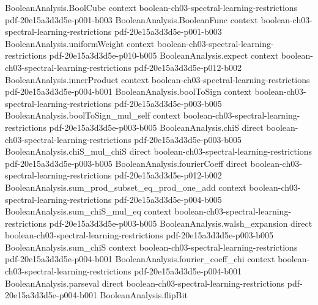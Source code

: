 \begin{lemma}
\label{KKL.lowDegree_approx}
\leanok
{}
\proofstep
  {BooleanAnalysis.BoolCube}
  {context}
  {boolean-ch03-spectral-learning-restrictions}
  {pdf-20e15a3d3d5e-p001-b003}
\proofstep
  {BooleanAnalysis.BooleanFunc}
  {context}
  {boolean-ch03-spectral-learning-restrictions}
  {pdf-20e15a3d3d5e-p001-b003}
\proofstep
  {BooleanAnalysis.uniformWeight}
  {context}
  {boolean-ch03-spectral-learning-restrictions}
  {pdf-20e15a3d3d5e-p010-b005}
\proofstep
  {BooleanAnalysis.expect}
  {context}
  {boolean-ch03-spectral-learning-restrictions}
  {pdf-20e15a3d3d5e-p012-b002}
\proofstep
  {BooleanAnalysis.innerProduct}
  {context}
  {boolean-ch03-spectral-learning-restrictions}
  {pdf-20e15a3d3d5e-p004-b001}
\proofstep
  {BooleanAnalysis.boolToSign}
  {context}
  {boolean-ch03-spectral-learning-restrictions}
  {pdf-20e15a3d3d5e-p003-b005}
\proofstep
  {BooleanAnalysis.boolToSign_mul_self}
  {context}
  {boolean-ch03-spectral-learning-restrictions}
  {pdf-20e15a3d3d5e-p003-b005}
\proofstep
  {BooleanAnalysis.chiS}
  {direct}
  {boolean-ch03-spectral-learning-restrictions}
  {pdf-20e15a3d3d5e-p003-b005}
\proofstep
  {BooleanAnalysis.chiS_mul_chiS}
  {direct}
  {boolean-ch03-spectral-learning-restrictions}
  {pdf-20e15a3d3d5e-p003-b005}
\proofstep
  {BooleanAnalysis.fourierCoeff}
  {direct}
  {boolean-ch03-spectral-learning-restrictions}
  {pdf-20e15a3d3d5e-p012-b002}
\proofstep
  {BooleanAnalysis.sum_prod_subset_eq_prod_one_add}
  {context}
  {boolean-ch03-spectral-learning-restrictions}
  {pdf-20e15a3d3d5e-p004-b005}
\proofstep
  {BooleanAnalysis.sum_chiS_mul_eq}
  {context}
  {boolean-ch03-spectral-learning-restrictions}
  {pdf-20e15a3d3d5e-p003-b005}
\proofstep
  {BooleanAnalysis.walsh_expansion}
  {direct}
  {boolean-ch03-spectral-learning-restrictions}
  {pdf-20e15a3d3d5e-p003-b005}
\proofstep
  {BooleanAnalysis.sum_chiS}
  {context}
  {boolean-ch03-spectral-learning-restrictions}
  {pdf-20e15a3d3d5e-p004-b001}
\proofstep
  {BooleanAnalysis.fourier_coeff_chi}
  {context}
  {boolean-ch03-spectral-learning-restrictions}
  {pdf-20e15a3d3d5e-p004-b001}
\proofstep
  {BooleanAnalysis.parseval}
  {direct}
  {boolean-ch03-spectral-learning-restrictions}
  {pdf-20e15a3d3d5e-p004-b001}
\proofstep
  {BooleanAnalysis.flipBit}

\end{lemma}
